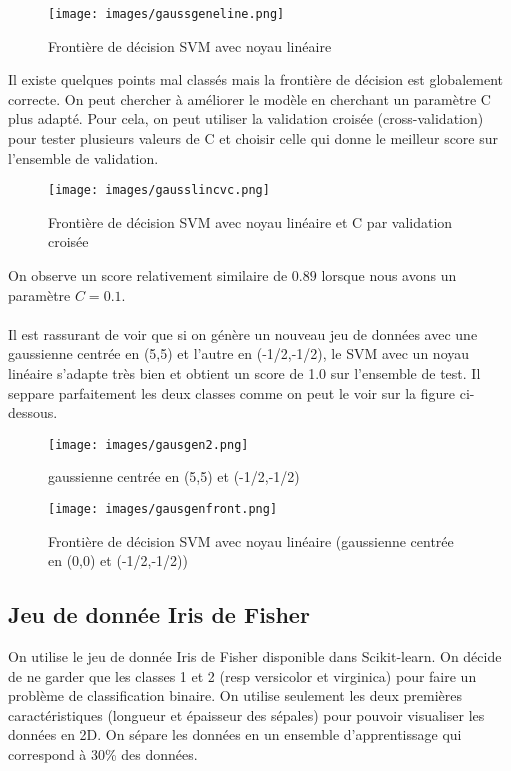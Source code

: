 \documentclass[a4paper, 12pt]{article}
\begin{document}
\begin{figure}[!htbp]
    \centering
    \texttt{[image: images/gaussgeneline.png]}
    \caption{Frontière de décision SVM avec noyau linéaire}
    \label{fig:linear_kernel}
\end{figure}

Il existe quelques points mal classés mais la frontière de décision est globalement correcte. On peut chercher à améliorer le modèle en cherchant un paramètre C plus adapté. Pour cela, on peut utiliser la validation croisée (cross-validation) pour tester plusieurs valeurs de C et choisir celle qui donne le meilleur score sur l'ensemble de validation.
\begin{figure}[!htbp]
    \centering
    \texttt{[image: images/gausslincvc.png]}
    \caption{Frontière de décision SVM avec noyau linéaire et C par validation croisée}
    \label{fig:linear_kernel_3}
\end{figure}
On observe un score relativement similaire de $0.89$ lorsque nous avons un paramètre $C=0.1$.
\\
\\
Il est rassurant de voir que si on génère un nouveau jeu de données avec une gaussienne centrée en (5,5) et l'autre en (-1/2,-1/2), le SVM avec un noyau linéaire s'adapte très bien et obtient un score de 1.0 sur l'ensemble de test.
Il seppare parfaitement les deux classes comme on peut le voir sur la figure ci-dessous.

\begin{figure}[!htbp]
    \centering
    \texttt{[image: images/gausgen2.png]}
    \caption{gaussienne centrée en (5,5) et (-1/2,-1/2)}
    \label{fig:linear_kernel_2}
\end{figure}

\begin{figure}[H]
    \centering
    \texttt{[image: images/gausgenfront.png]}
    \caption{Frontière de décision SVM avec noyau linéaire (gaussienne centrée en (0,0) et (-1/2,-1/2))}
    \label{fig:linear_kernel_3}
\end{figure}





\subsection*{Jeu de donnée Iris de Fisher}

On utilise le jeu de donnée Iris de Fisher disponible dans Scikit-learn. On décide de ne garder que les classes 1 et 2 (resp versicolor et virginica) pour faire un problème de classification binaire.
On utilise seulement les deux premières caractéristiques (longueur et épaisseur des sépales) pour pouvoir visualiser les données en 2D.
On sépare les données en un ensemble d'apprentissage qui correspond à 30\% des données.
\end{document}
